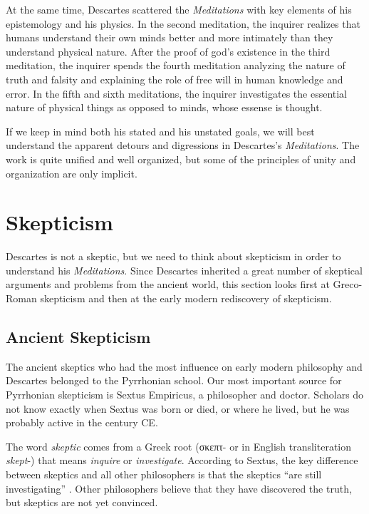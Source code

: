 At the same time, Descartes scattered the \textit{Meditations} with key elements of his epistemology and his physics. In the second meditation, the inquirer realizes that humans understand their own minds better and more intimately than they understand physical nature. After the proof of god's existence in the third meditation, the inquirer spends the fourth meditation analyzing the nature of truth and falsity and explaining the role of free will in human knowledge and error. In the fifth and sixth meditations, the inquirer investigates the essential nature of physical things as opposed to minds, whose essense is thought.

If we keep in mind both his stated and his unstated goals, we will best understand the apparent detours and digressions in Descartes's \textit{Meditations}. The work is quite unified and well organized, but some of the principles of unity and organization are only implicit.

\section{Skepticism}

Descartes is not a skeptic, but we need to think about skepticism in order to understand his \textit{Meditations}. Since Descartes inherited a great number of skeptical arguments and problems from the ancient world, this section looks first at Greco-Roman skepticism and then at the early modern rediscovery of skepticism.

\subsection*{Ancient Skepticism}

The ancient skeptics who had the most influence on early modern philosophy and Descartes belonged to the Pyrrhonian school. Our most important source for Pyrrhonian skepticism is Sextus Empiricus, a philosopher and doctor. Scholars do not know exactly when Sextus was born or died, or where he lived, but he was probably active in the  century CE.

The word \textit{skeptic} comes from a Greek root (\textgreek{σκεπτ}- or in English transliteration \textit{skept}-) that means \textit{inquire} or \textit{investigate}. According to Sextus, the key difference between skeptics and all other philosophers is that the skeptics ``are still investigating'' \parencite[I 3]{annasbarnes1994}. Other philosophers believe that they have discovered the truth, but skeptics are not yet convinced.

